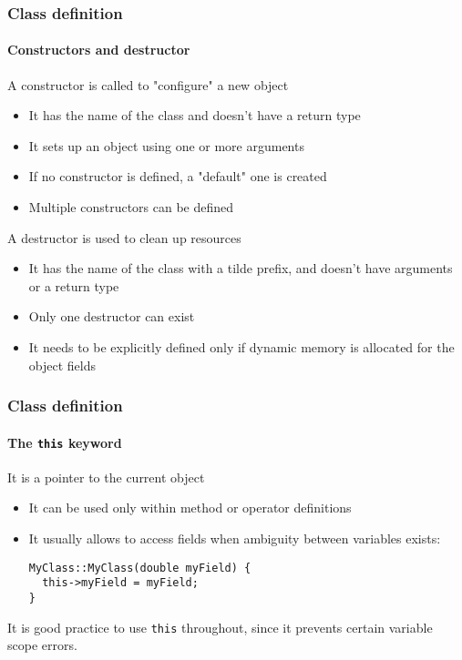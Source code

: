 \begin{frame}
\frametitle{Class definition}
\framesubtitle{Constructors and destructor}

\begin{block}{A constructor is called to "configure" a new object}
\begin{itemize}
\item It has the name of the class and doesn't have a return type
\item It sets up an object using one or more arguments
\item If no constructor is defined, a "default" one is created
\item Multiple constructors can be defined
\end{itemize}
\end{block}
\pause
\begin{block}{A destructor is used to clean up resources}
\begin{itemize}
\item It has the name of the class with a tilde prefix, and doesn't have arguments or a return type
\item Only one destructor can exist
\item It needs to be explicitly defined only if dynamic memory is allocated for the object fields
\end{itemize}
\end{block}

\end{frame}

\begin{frame}[fragile]
\frametitle{Class definition}
\framesubtitle{The \texttt{this} keyword}

\begin{block}{It is a pointer to the current object}
\begin{itemize}
\item It can be used only within method or operator definitions
\item It usually allows to access fields when ambiguity between variables exists:
\begin{verbatim}
MyClass::MyClass(double myField) {
  this->myField = myField;
}
\end{verbatim}
\end{itemize}
It is good practice to use \texttt{this} throughout, since it prevents certain variable scope errors.
\end{block}

\end{frame}


